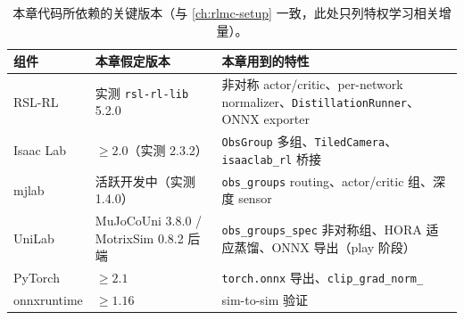 \begin{table}[H]
\centering
\small
\caption{本章代码所依赖的关键版本（与 \cref{ch:rlmc-setup} 一致，此处只列特权学习相关增量）。}
\label{tab:rlmc-priv-versions}
\begin{tabularx}{\linewidth}{@{}lLL@{}}
\toprule
组件 & 本章假定版本 & 本章用到的特性 \\
\midrule
RSL-RL & 实测 \texttt{rsl-rl-lib} 5.2.0 & 非对称 actor/critic、per-network normalizer、\texttt{DistillationRunner}、ONNX exporter \\
Isaac Lab & $\ge 2.0$（实测 2.3.2） & \texttt{ObsGroup} 多组、\texttt{TiledCamera}、\texttt{isaaclab\_rl} 桥接 \\
mjlab & 活跃开发中（实测 1.4.0） & \texttt{obs\_groups} routing、actor/critic 组、深度 sensor \\
UniLab & MuJoCoUni 3.8.0 / MotrixSim 0.8.2 后端 & \texttt{obs\_groups\_spec} 非对称组、HORA 适应蒸馏、ONNX 导出（play 阶段） \\
PyTorch & $\ge 2.1$ & \texttt{torch.onnx} 导出、\texttt{clip\_grad\_norm\_} \\
onnxruntime & $\ge 1.16$ & sim-to-sim 验证 \\
\bottomrule
\end{tabularx}
\end{table}

